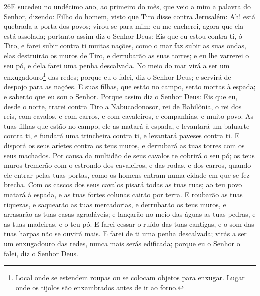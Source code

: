 \lettrine{26} E sucedeu no undécimo ano, ao primeiro do mês,
que veio a mim a palavra do Senhor, dizendo: Filho do homem,
visto que Tiro disse contra Jerusalém: Ah! está quebrada a porta dos
povos; virou-se para mim; eu me encherei, agora que ela está
assolada; portanto assim diz o Senhor Deus: Eis que eu estou
contra ti, ó Tiro, e farei subir contra ti muitas nações, como o mar
faz subir as suas ondas, elas destruirão os muros de Tiro, e
derrubarão as suas torres; e eu lhe varrerei o seu pó, e dela farei
uma penha descalvada. No meio do mar virá a ser um
enxugadouro\footnote{Local onde se estendem roupas ou se colocam
objetos para enxugar. Lugar onde os tijolos são enxambrados antes de
ir ao forno.} das redes; porque eu o falei, diz o Senhor Deus; e
servirá de despojo para as nações. E suas filhas, que estão no
campo, serão mortas à espada; e saberão que eu sou o Senhor.
Porque assim diz o Senhor Deus: Eis que eu, desde o norte,
trarei contra Tiro a Nabucodonosor, rei de Babilônia, o rei dos
reis, com cavalos, e com carros, e com cavaleiros, e companhias, e
muito povo. As tuas filhas que estão no campo, ele as matará à
espada, e levantará um baluarte contra ti, e fundará uma trincheira
contra ti, e levantará paveses contra ti. E disporá os seus
aríetes contra os teus muros, e derrubará as tuas torres com os seus
machados. Por causa da multidão de seus cavalos te cobrirá o
seu pó; os teus muros tremerão com o estrondo dos cavaleiros, e das
rodas, e dos carros, quando ele entrar pelas tuas portas, como os
homens entram numa cidade em que se fez brecha. Com os cascos
dos seus cavalos pisará todas as tuas ruas; ao teu povo matará à
espada, e as tuas fortes colunas cairão por terra. E roubarão
as tuas riquezas, e saquearão as tuas mercadorias, e derrubarão os
teus muros, e arrasarão as tuas casas agradáveis; e lançarão no meio
das águas as tuas pedras, e as tuas madeiras, e o teu pó. E
farei cessar o ruído das tuas cantigas, e o som das tuas harpas não
se ouvirá mais. E farei de ti uma penha descalvada; virás a
ser um enxugadouro das redes, nunca mais serás edificada; porque eu
o Senhor o falei, diz o Senhor Deus.

